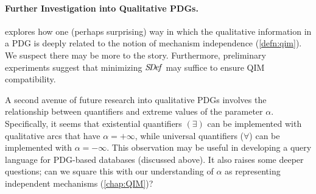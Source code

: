 \paragraph{Further Investigation into Qualitative PDGs.}
 explores how one (perhaps surprising) way in which the qualitative information in a PDG is deeply related to the notion of mechanism independence (\cref{defn:qim}).
We suspect there may be more to the story. 
%
Furthermore, preliminary experiments suggest that minimizing $\mathit{S\mskip-3.5muD\mskip-2.5mue\mskip-1.5muf}$ may suffice to ensure QIM compatibility. 

A second avenue of future research into qualitative PDGs involves the relationship between quantifiers and extreme values of the parameter $\alpha$. 
Specifically, it seems that existential quantifiers $(\exists)$ can be implemented with qualitative arcs that have $\alpha = +\infty$, while universal quantifiers ($\forall$) can be implemented with $\alpha = -\infty$. 
This observation may be useful in developing a query language for PDG-based databases (discussed above).
It also raises some deeper questions;
can we square this with our understanding of $\alpha$ as representing independent mechanisms (\cref{chap:QIM})?


